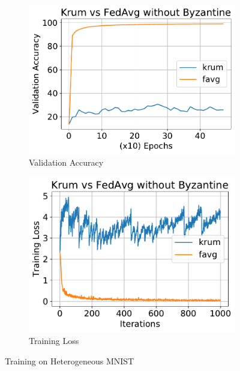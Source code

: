 \documentclass[11pt]{article}
\newcommand{\twocolfigwidth}{0.49\textwidth}
\begin{document}
\begin{figure}[ht]
    \begin{subfigure}[b]{\twocolfigwidth}
        \includegraphics[width=\textwidth]{figs/krum-vacc}
        \caption{Validation Accuracy}
    \end{subfigure}
    \begin{subfigure}[b]{\twocolfigwidth}
        \includegraphics[width=\textwidth]{figs/krum-loss}
        \caption{Training Loss}
    \end{subfigure}
    \centering
    \caption{Training on Heterogeneous MNIST}
    \label{fig:mnist}
\end{figure}
\end{document}
